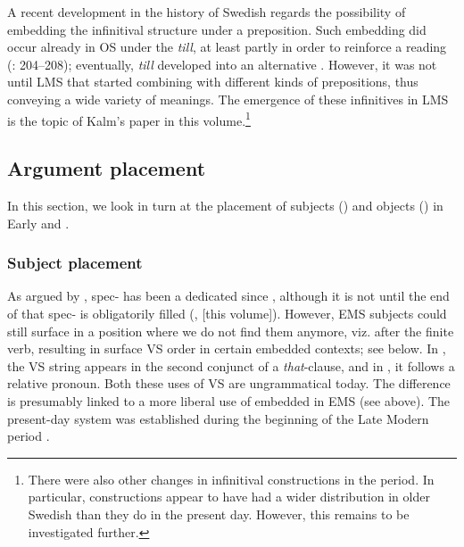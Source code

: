 \documentclass[output=paper]{langscibook}
\begin{document}
A recent development in the history of Swedish  regards the possibility of embedding the infinitival structure under a preposition. Such embedding did occur already in OS under the  \textit{till}, at least partly in order to reinforce a  reading (\citealt{Kalm2016Satsekvivalenta}: 204–208); eventually, \textit{till} developed into an alternative  \citep[210]{Kalm2016Satsekvivalenta}. However, it was not until LMS that  started combining with different kinds of prepositions, thus conveying a wide variety of  meanings. The emergence of these  infinitives in LMS is the topic of Kalm’s paper in this volume.\footnote{There were also other changes in infinitival constructions in the  period. In particular,  constructions appear to have had a wider distribution in older Swedish than they do in the present day. However, this remains to be investigated further.}


\subsection{ Argument placement}\label{sec:intro:3.2}


In this section, we look in turn at the placement of subjects () and objects () in Early and .


\subsubsection{Subject placement}\label{sec:intro:3.2.1}


As argued by \textcite{Hakansson2008}, spec- has been a dedicated  since , although it is not until the end of  that spec- is obligatorily filled (\citealt{Falk1993}, \citeyear{chapters/02} [this volume]). However, EMS subjects could still surface in a position where we do not find them anymore, viz. after the finite verb, resulting in surface VS order in certain embedded contexts; see  below. In , the VS string appears in the second conjunct of a \textit{that}{}-clause, and in , it follows a relative pronoun. Both these uses of VS are ungrammatical today. The difference is presumably linked to a more liberal use of embedded  in EMS (see  above). The present-day system was established during the beginning of the Late Modern period \citep{Petzell2013}.
\end{document}
